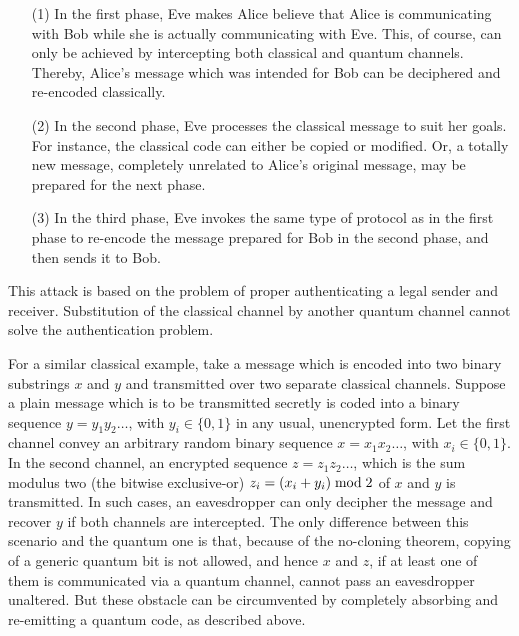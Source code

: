 \documentclass{ws-ijqi}
\begin{document}
\begin{itemize}
\item[(1)]
 In the first phase, Eve makes Alice believe that Alice is communicating with Bob
while she is actually communicating with Eve.
This, of course, can only be achieved by intercepting both classical and quantum channels.
Thereby, Alice's message which was intended for Bob can be deciphered and re-encoded classically.

\item[(2)]
 In the second phase, Eve processes the classical message to suit her goals.
For instance, the classical code can either be copied or modified.
Or, a totally new message, completely unrelated to Alice's original
message, may be prepared for the next phase.

\item[(3)]
 In the third phase, Eve invokes the same type of protocol as in the first phase
to re-encode the message prepared for Bob in the second phase,
and then sends it to Bob.
\end{itemize}

This attack is based on the problem of proper authenticating a legal sender and receiver.
Substitution of the classical channel by another quantum channel cannot solve the
authentication problem.

For a similar classical example, take
a message which is  encoded into two binary substrings $x$ and $y$
and transmitted over two separate classical channels.
Suppose a plain message which is to be transmitted secretly is coded into a binary sequence
$y=y_1y_2\ldots$, with $y_i\in \{0,1\}$ in any usual, unencrypted form.
Let the first channel convey an arbitrary random binary sequence $x=x_1x_2\ldots$,
with $x_i\in \{0,1\}$.
In the second channel, an encrypted sequence $z=z_1z_2\ldots$,
which is the sum modulus two
(the bitwise exclusive-or) $z_i=(x_i+y_i) \;{\rm  mod}\; 2$
of $x$ and $y$ is transmitted.
In such cases, an eavesdropper can only decipher the message and recover $y$ if both channels are intercepted.
The only difference between this scenario and the quantum one is
that, because of the no-cloning theorem, copying of a generic quantum bit is not allowed,
and hence $x$ and $z$, if at least one  of them
is communicated via a quantum channel,
cannot pass an eavesdropper unaltered.
But these obstacle can be circumvented by completely absorbing
and re-emitting a quantum code, as described above.
\end{document}
